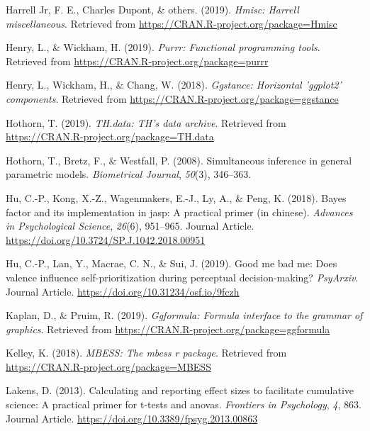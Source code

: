\documentclass[man]{apa6}
\begin{document}
\leavevmode\hypertarget{ref-R-Hmisc}{}%
Harrell Jr, F. E., Charles Dupont, \& others. (2019). \emph{Hmisc: Harrell miscellaneous}. Retrieved from \url{https://CRAN.R-project.org/package=Hmisc}

\leavevmode\hypertarget{ref-R-purrr}{}%
Henry, L., \& Wickham, H. (2019). \emph{Purrr: Functional programming tools}. Retrieved from \url{https://CRAN.R-project.org/package=purrr}

\leavevmode\hypertarget{ref-R-ggstance}{}%
Henry, L., Wickham, H., \& Chang, W. (2018). \emph{Ggstance: Horizontal 'ggplot2' components}. Retrieved from \url{https://CRAN.R-project.org/package=ggstance}

\leavevmode\hypertarget{ref-R-TH.data}{}%
Hothorn, T. (2019). \emph{TH.data: TH's data archive}. Retrieved from \url{https://CRAN.R-project.org/package=TH.data}

\leavevmode\hypertarget{ref-R-multcomp}{}%
Hothorn, T., Bretz, F., \& Westfall, P. (2008). Simultaneous inference in general parametric models. \emph{Biometrical Journal}, \emph{50}(3), 346--363.

\leavevmode\hypertarget{ref-Hu_2018_JASP}{}%
Hu, C.-P., Kong, X.-Z., Wagenmakers, E.-J., Ly, A., \& Peng, K. (2018). Bayes factor and its implementation in jasp: A practical primer (in chinese). \emph{Advances in Psychological Science}, \emph{26}(6), 951--965. Journal Article. \url{https://doi.org/10.3724/SP.J.1042.2018.00951}

\leavevmode\hypertarget{ref-Hu_2019_GoodSelf}{}%
Hu, C.-P., Lan, Y., Macrae, C. N., \& Sui, J. (2019). Good me bad me: Does valence influence self-prioritization during perceptual decision-making? \emph{PsyArxiv}. Journal Article. \url{https://doi.org/10.31234/osf.io/9fczh}

\leavevmode\hypertarget{ref-R-ggformula}{}%
Kaplan, D., \& Pruim, R. (2019). \emph{Ggformula: Formula interface to the grammar of graphics}. Retrieved from \url{https://CRAN.R-project.org/package=ggformula}

\leavevmode\hypertarget{ref-R-MBESS}{}%
Kelley, K. (2018). \emph{MBESS: The mbess r package}. Retrieved from \url{https://CRAN.R-project.org/package=MBESS}

\leavevmode\hypertarget{ref-Lakens_2013}{}%
Lakens, D. (2013). Calculating and reporting effect sizes to facilitate cumulative science: A practical primer for t-tests and anovas. \emph{Frontiers in Psychology}, \emph{4}, 863. Journal Article. \url{https://doi.org/10.3389/fpsyg.2013.00863}
\end{document}
